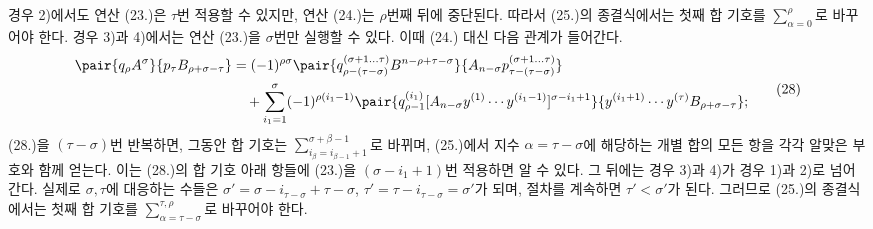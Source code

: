 
경우 2)에서도 연산 (23.)은 $\tau$번 적용할 수 있지만, 연산 (24.)는 $\rho$번째 뒤에 중단된다. 따라서 (25.)의 종결식에서는 첫째 합 기호를 $\sum_{\alpha=0}^{\rho}$로 바꾸어야 한다. 경우 3)과 4)에서는 연산 (23.)을 $\sigma$번만 실행할 수 있다. 이때 (24.) 대신 다음 관계가 들어간다.
\begin{equation}
\begin{aligned}
\pair{q_\rho A^\sigma}{p_\tau B_{\rho+\sigma-\tau}}
&=(-1)^{\rho\sigma}
 \pair{q_{\rho-(\tau-\sigma)}^{(\sigma+1\ldots\tau)}B^{n-\rho+\tau-\sigma}}{A_{n-\sigma}p_{\tau-(\tau-\sigma)}^{(\sigma+1\ldots\tau)}}\\
&\quad+\sum_{i_1=1}^{\sigma}(-1)^{\rho(i_1-1)}
 \pair{q_{\rho-1}^{(i_1)}[A_{n-\sigma}y^{(1)}\cdots y^{(i_1-1)}]^{\sigma-i_1+1}}
 {y^{(i_1+1)}\cdots y^{(\tau)}B_{\rho+\sigma-\tau}};
\end{aligned}
\tag{28}
\end{equation}
(28.)을 $(\tau-\sigma)$번 반복하면, 그동안 합 기호는 $\sum_{i_\beta=i_{\beta-1}+1}^{\sigma+\beta-1}$로 바뀌며, (25.)에서 지수 $\alpha=\tau-\sigma$에 해당하는 개별 합의 모든 항을 각각 알맞은 부호와 함께 얻는다. 이는 (28.)의 합 기호 아래 항들에 (23.)을 $(\sigma-i_1+1)$번 적용하면 알 수 있다. 그 뒤에는 경우 3)과 4)가 경우 1)과 2)로 넘어간다. 실제로 $\sigma,\tau$에 대응하는 수들은 $\sigma'=\sigma-i_{\tau-\sigma}+\tau-\sigma$, $\tau'=\tau-i_{\tau-\sigma}=\sigma'$가 되며, 절차를 계속하면 $\tau'<\sigma'$가 된다. 그러므로 (25.)의 종결식에서는 첫째 합 기호를 $\sum_{\alpha=\tau-\sigma}^{\tau,\rho}$로 바꾸어야 한다.
